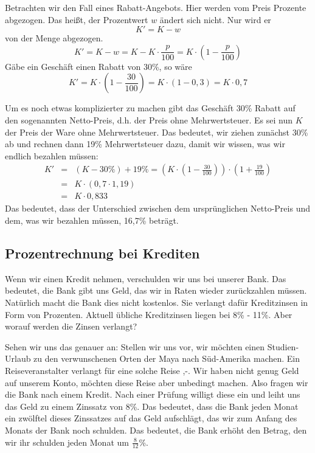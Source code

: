 Betrachten wir den Fall eines Rabatt-Angebots. Hier werden vom Preis Prozente abgezogen. Das heißt, der Prozentwert $w$ ändert sich nicht. Nur wird er
\[
K' = K-w
\]
von der Menge abgezogen.
\[
K' = K-w = K-K\cdot \frac{p}{100} = K\cdot \left(1-\frac{p}{100}\right) 
\]
Gäbe ein Geschäft einen Rabatt von 30\%, so wäre 
\[
K' = K\cdot \left(1-\frac{30}{100}\right) = K\cdot (1-0,3) = K\cdot 0,7
\]

Um es noch etwas komplizierter zu machen gibt das Geschäft 30\% Rabatt auf den sogenannten Netto-Preis, d.h. der Preis ohne Mehrwertsteuer. Es sei nun $K$ der Preis der Ware ohne Mehrwertsteuer. Das bedeutet, wir ziehen zunächst 30\% ab und rechnen dann 19\% Mehrwertsteuer dazu, damit wir wissen, was wir endlich bezahlen müssen:
\begin{eqnarray*}
K' &=& (K-30\% ) + 19\% = \left( K\cdot \left( 1-\frac{30}{100} \right) \right)\cdot \left( 1+\frac{19}{100} \right)\\
&=& K\cdot \left( 0,7 \cdot 1,19 \right)\\
&=& K\cdot 0,833
\end{eqnarray*}
Das bedeutet, dass der Unterschied zwischen dem ursprünglichen Netto-Preis und dem, was wir bezahlen müssen, 16,7\% beträgt.

\subsection{Prozentrechnung bei Krediten}

Wenn wir einen Kredit nehmen, verschulden wir uns bei unserer Bank. Das bedeutet, die Bank gibt uns Geld, das wir in Raten wieder zurückzahlen müssen. Natürlich macht die Bank dies nicht kostenlos. Sie verlangt dafür Kreditzinsen in Form von Prozenten. Aktuell übliche Kreditzinsen liegen bei 8\% - 11\%. Aber worauf werden die Zinsen verlangt?

Sehen wir uns das genauer an: Stellen wir uns vor, wir möchten einen Studien-Urlaub zu den verwunschenen Orten der Maya nach Süd-Amerika machen. Ein Reiseveranstalter verlangt für eine solche Reise ,-. Wir haben nicht genug Geld auf unserem Konto, möchten diese Reise aber unbedingt machen. Also fragen wir die Bank nach einem Kredit. Nach einer Prüfung willigt diese ein und leiht uns das Geld zu einem Zinssatz von 8\%. Das bedeutet, dass die Bank jeden Monat ein zwölftel dieses Zinssatzes auf das Geld aufschlägt, das wir zum Anfang des Monats der Bank noch schulden. Das bedeutet, die Bank erhöht den Betrag, den wir ihr schulden jeden Monat um $\frac{8}{12}$\%.

